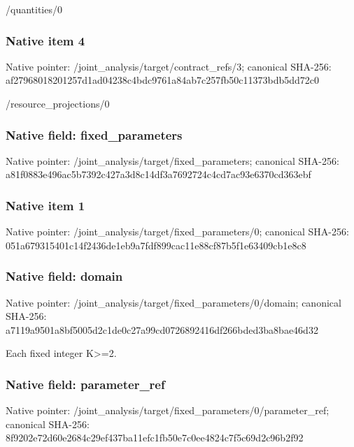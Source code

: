 \documentclass[10pt,a4paper]{article}
\begin{document}
\begingroup\raggedright\sloppy /\allowbreak{}quantities/\allowbreak{}0\par\endgroup

\subsubsection{Native item 4}
Native pointer: /joint\_\allowbreak{}analysis/target/contract\_\allowbreak{}refs/3; canonical SHA-256: af27968018201257d1ad04238c4bdc9761a84ab7c257fb50c11373bdb5dd72c0

\begingroup\raggedright\sloppy /\allowbreak{}resource\_\allowbreak{}projections/\allowbreak{}0\par\endgroup

\subsubsection{Native field: fixed\_\allowbreak{}parameters}
Native pointer: /joint\_\allowbreak{}analysis/target/fixed\_\allowbreak{}parameters; canonical SHA-256: a81f0883e496ac5b7392c427a3d8c14df3a7692724c4cd7ac93e6370cd363ebf

\subsubsection{Native item 1}
Native pointer: /joint\_\allowbreak{}analysis/target/fixed\_\allowbreak{}parameters/0; canonical SHA-256: 051a679315401c14f2436de1eb9a7fdf899cac11e88cf87b5f1e63409cb1e8c8

\subsubsection{Native field: domain}
Native pointer: /joint\_\allowbreak{}analysis/target/fixed\_\allowbreak{}parameters/0/domain; canonical SHA-256: a7119a9501a8bf5005d2c1de0c27a99cd0726892416df266bded3ba8bae46d32

\begingroup\raggedright\sloppy Each fixed integer K>=\allowbreak{}2.\par\endgroup

\subsubsection{Native field: parameter\_\allowbreak{}ref}
Native pointer: /joint\_\allowbreak{}analysis/target/fixed\_\allowbreak{}parameters/0/parameter\_\allowbreak{}ref; canonical SHA-256: 8f9202e72d60e2684c29ef437ba11efc1fb50e7c0ee4824c7f5c69d2c96b2f92
\end{document}
